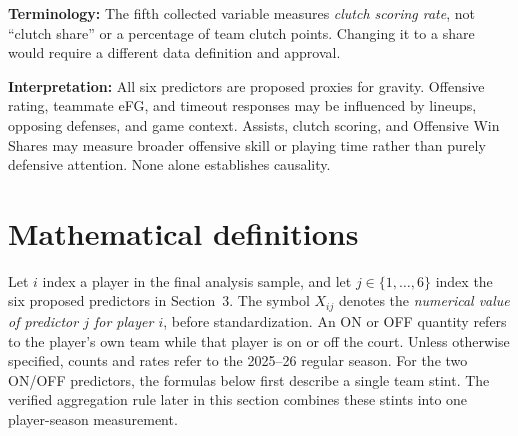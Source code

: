 \documentclass[11pt]{article}
\begin{document}
\textbf{Terminology:} The fifth collected variable measures \emph{clutch
scoring rate}, not ``clutch share'' or a percentage of team clutch points.
Changing it to a share would require a different data definition and approval.

\textbf{Interpretation:} All six predictors are proposed proxies for gravity.
Offensive rating, teammate eFG, and timeout responses may be influenced by
lineups, opposing defenses, and game context. Assists, clutch scoring, and Offensive Win Shares may measure broader offensive skill or playing time rather than
purely defensive attention. None alone establishes causality.

\section{Mathematical definitions}
Let $i$ index a player in the final analysis sample, and let $j\in\{1,\dots,6\}$
index the six proposed predictors in Section~3. The symbol $X_{ij}$ denotes
the \emph{numerical value of predictor $j$ for player $i$}, before
standardization. An ON or OFF quantity refers to the player's own team while
that player is on or off the court. Unless otherwise specified, counts and
rates refer to the 2025--26 regular season. For the two ON/OFF predictors, the formulas below first describe a single
team stint. The verified aggregation rule later in this section combines
these stints into one player-season measurement.
\end{document}
